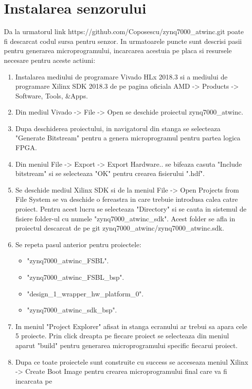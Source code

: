\section{Instalarea senzorului}\label{sec:iu_instalare_senzor}
Da la urmatorul link https://github.com/Coposescu/zynq7000\_atwinc.git poate fi descarcat codul sursa pentru senzor. In urmatoarele puncte sunt descrisi pasii 
pentru generarea microprogramului, incarcarea acestuia pe placa si resursele necesare pentru aceste actiuni:
\begin{enumerate}
    \item Instalarea mediului de programare Vivado HLx 2018.3 si a mediului de programare Xilinx SDK 2018.3 de pe pagina oficiala AMD -> Products -> 
    Software, Tools, \&Apps.
    \item Din mediul Vivado -> File -> Open se deschide proiectul zynq7000\_atwinc.
    \item Dupa deschiderea proiectului, in navigatorul din stanga se selecteaza "Generate Bitstream" pentru a genera microprogramul pentru partea logica FPGA.
    \item Din meniul File -> Export -> Export Hardware.. se bifeaza casuta "Include bitstream" si se selecteaza "OK" pentru crearea fisierului ".hdf".
    \item Se deschide mediul Xilinx SDK si de la meniul File -> Open Projects from File System se va deschide o fereastra in care trebuie introdusa calea catre 
    proiect. Pentru acest lucru se selecteaza "Directory" si se cauta in sistemul de fisiere folder-ul cu numele "zynq7000\_atwinc\_sdk". Acest folder se afla in 
    proiectul descarcat de pe git zynq7000\_atwinc/zynq7000\_atwinc.sdk.
    \item Se repeta pasul anterior pentru proiectele: 
    \begin{itemize}
        \item "zynq7000\_atwinc\_FSBL".
        \item "zynq7000\_atwinc\_FSBL\_bsp".
        \item "design\_1\_wrapper\_hw\_platform\_0".
        \item "zynq7000\_atwinc\_sdk\_bsp".
    \end{itemize}
    \item In meniul "Project Explorer" afisat in stanga ecranului ar trebui sa apara cele 5 proiecte. Prin click dreapta pe fiecare proiect se selecteaza din meniul aparut 
    "build" pentru generarea microprogramului specific fiecarui proiect.
    \item Dupa ce toate proiectele sunt construite cu success se acceseaza meniul Xilinx -> Create Boot Image pentru crearea microprogramului final care va fi incarcata pe 

\end{enumerate}
